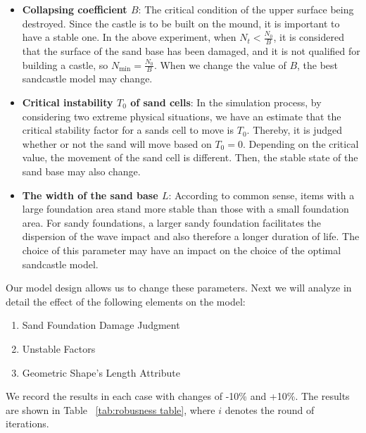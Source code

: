 \documentclass{mcmthesis}		    %
\begin{document}
	\begin{itemize}
	    \item \textbf{Collapsing coefficient $B$}: The critical condition of the upper surface being destroyed. Since the castle is to be built on the mound, it is important to have a stable one. In the above experiment, when $N_t < \frac{N_{0}}{B}$, it is considered that the surface of the sand base has been damaged, and it is not qualified for building a castle, so $N_\text{min} = \frac{N_{0}}{B}$. When we change the value of $B$, the best sandcastle model may change.
	    \item \textbf{Critical instability $T_0$ of sand cells}: In the simulation process, by considering two extreme physical situations, we have an estimate that the critical stability factor for a sands cell to move is $T_0$. Thereby, it is judged whether or not the sand will move based on $T_0 = 0$.
        Depending on the critical value, the movement of the sand cell is different. Then, the stable state of the sand base may also change.
         \item \textbf{The width of the sand base $L$}: According to common sense, items with a large foundation area stand more stable than those with a small foundation area. For sandy foundations, a larger sandy foundation facilitates the dispersion of the wave impact and also therefore a longer duration of life. The choice of this parameter may have an impact on the choice of the optimal sandcastle model.
        

	\end{itemize}
	
	 Our model design allows us to change these parameters. Next we will analyze in detail the effect of the following elements on the model:
        \begin{enumerate}
            \item Sand Foundation Damage Judgment
            \item Unstable Factors
            \item Geometric Shape’s Length Attribute
        \end{enumerate}
	We record the results in each case with changes of -10\% and +10\%. The results are shown in Table ~\ref{tab:robusness table}, where $i$ denotes the round of iterations.
	
	
	\begin{table}[hbtp]
		\centering
		\caption{Results of Robustness Analysis}
	\end{table}
	
\end{document}
